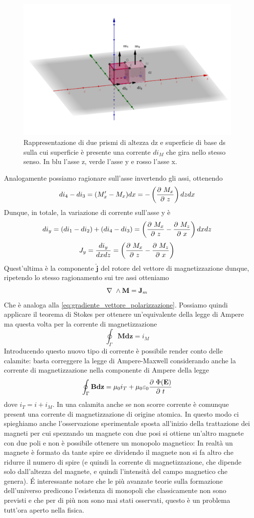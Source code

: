 \documentclass[
10pt, %
a4paper, %
oneside, %
headinclude,footinclude, %
BCOR5mm, %
]{scrartcl}
\begin{document}
\begin{figure}[h!]
	\centering
	\includegraphics[width=0.7\linewidth]{images/prismi_1}
	\caption{Rappresentazione di due prismi di altezza dz e superficie di base ds sulla cui superficie è presente una corrente \(di_M\) che gira nello stesso senso. In blu l'asse z, verde l'asse y e rosso l'asse x.}
	\label{fig:prismi1}
\end{figure}
\FloatBarrier
Analogamente possiamo ragionare sull'asse invertendo gli assi, ottenendo
\[di_4 - di_3 = (M'_x - M_x)dx = -\left(\frac{\partial\  M_x}{\partial\  z}\right)dz dx\]
Dunque, in totale, la variazione di corrente sull'asse y è
\[di_y = (di_1 -di_2)+(di_4-di_3)=\left(\frac{\partial\  M_x}{\partial\  z}-\frac{\partial\  M_z}{\partial\  x}\right)dxdz\]
\[J_y = \frac{di_y}{dxdz} = \left(\frac{\partial\  M_x}{\partial\  z}-\frac{\partial\  M_z}{\partial\  x}\right) \]
Quest'ultima è la componente \(\mathbf{\hat{j}}\) del rotore del vettore di magnetizzazione dunque, ripetendo lo stesso ragionamento sui tre assi otteniamo
\[\nabla\ \wedge\mathbf{M} = \mathbf{J}_m\]
Che è analoga alla \ref{eq:gradiente_vettore_polarizzazione}. Possiamo quindi applicare il teorema di Stokes per ottenere un'equivalente della legge di Ampere ma questa volta per la corrente di magnetizzazione
\[\oint_\Gamma\mathbf{M}\mathbf{dz} = i_M\]
Introducendo questo nuovo tipo di corrente è possibile render conto delle calamite: basta correggere la legge di Ampere-Maxwell considerando anche la corrente di magnetizzazione nella componente di Ampere della legge
\[\oint_\Gamma \mathbf{B}\mathbf{dz} = \mu_0 i_T + \mu_0\varepsilon_0\frac{\partial\ \Phi(\mathbf{E})}{\partial\  t}\]
dove \(i_T = i+i_M\). In una calamita anche se non scorre corrente è comunque present una corrente di magnetizzazione di origine atomica. In questo modo ci spieghiamo anche l'osservazione sperimentale sposta all'inizio della trattazione dei magneti per cui spezzando un magnete con due posi si ottiene un'altro magnete con due poli e non è possibile ottenere un monopolo magnetico: In realtà un magnete è formato da tante spire ee dividendo il magnete non si fa altro che ridurre il numero di spire (e quindi la corrente di magnetizzazione, che dipende solo dall'altezza del magnete, e quindi l'intensità del campo magnetico che genera). \'{E} interessante notare che le più avanzate teorie sulla formazione dell'universo predicono l'esistenza di monopoli che classicamente non sono previsti e che per di più non sono mai stati osservati, questo è un problema tutt'ora aperto nella fisica.\\
\end{document}
